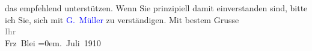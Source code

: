                das empfehlend unterstützen. Wenn Sie prinzipiell damit einverstanden sind, bitte ich
               Sie, sich mit \textcolor{blue}{G. Müller}{}\ledrightnote{\textcolor{blue}{Georg Müller}} zu verständigen.\pend
           \pstart
           Mit bestem Grusse{\\[\baselineskip]}\textcolor{gray}{Ihr}{\\[\baselineskip]}\spacefill\mbox{Frz Blei}\pend
           \leftskip=0em{}. Juli 1910\pend
           \endnumbering{}  
      